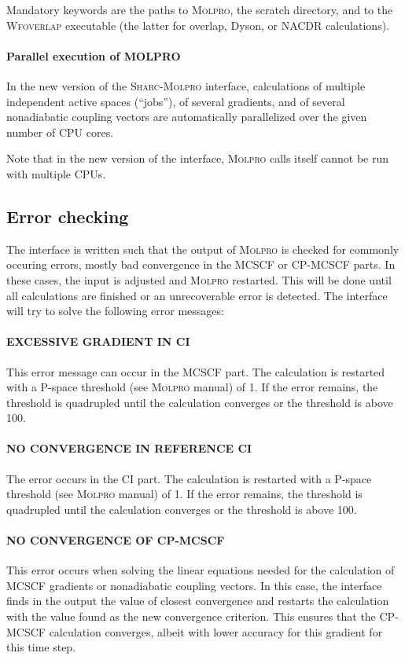 \documentclass[a4paper,10pt,DIV=15,openany,twoside=false]{scrbook}
\newcommand{\sharc}{\textsc{Sharc}}
\begin{document}
Mandatory keywords are the paths to \textsc{Molpro}, the scratch directory, and to the \textsc{Wfoverlap} executable (the latter for overlap, Dyson, or NACDR calculations).

\paragraph{Parallel execution of MOLPRO}

In the new version of the \sharc-\textsc{Molpro} interface, calculations of multiple independent active spaces (``jobs''), of several gradients, and of several nonadiabatic coupling vectors are automatically parallelized over the given number of CPU cores.

Note that in the new version of the interface, \textsc{Molpro} calls itself cannot be run with multiple CPUs.


\subsection{Error checking}

The interface is written such that the output of \textsc{Molpro} is checked for commonly occuring errors, mostly bad convergence in the MCSCF or CP-MCSCF parts. In these cases, the input is adjusted and \textsc{Molpro} restarted. This will be done until all calculations are finished or an unrecoverable error is detected.
The interface will try to solve the following error messages:

\paragraph{EXCESSIVE GRADIENT IN CI} This error message can occur in the MCSCF part. The calculation is restarted with a P-space threshold (see \textsc{Molpro} manual) of 1. If the error remains, the threshold is quadrupled until the calculation converges or the threshold is above 100.

\paragraph{NO CONVERGENCE IN REFERENCE CI} The error occurs in the CI part. The calculation is restarted with a P-space threshold (see \textsc{Molpro} manual) of 1. If the error remains, the threshold is quadrupled until the calculation converges or the threshold is above 100.

\paragraph{NO CONVERGENCE OF CP-MCSCF} This error occurs when solving the linear equations needed for the calculation of MCSCF gradients or nonadiabatic coupling vectors. In this case, the interface finds in the output the value of closest convergence and restarts the calculation with the value found as the new convergence criterion. This ensures that the CP-MCSCF calculation converges, albeit with lower accuracy for this gradient for this time step.
\end{document}
